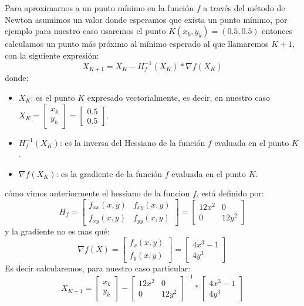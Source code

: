 \justify
Para aproximarnos a un punto mínimo en la función $f$ a través del método de Newton asumimos un valor donde esperamos que exista un punto mínimo, por ejemplo para nuestro caso usaremos el punto $K(x_{k},y_{k})=(0.5,0.5)$ entonces calculamos un punto más próximo al mínimo esperado al que llamaremos $K+1$, con la siguiente expresión:
\[X_{K+1}=X_{K}-H^{-1}_{f}(X_{K}) * \nabla f(X_{K}) \]
\flushleft
donde:
\begin{itemize}
    \item $X_{K}$: es el punto $K$ expresado vectorialmente, es decir, en nuestro caso $X_{K}=\begin{bmatrix}
        x_{k} \\
        y_{k}
    \end{bmatrix}=
    \begin{bmatrix}
        0.5 \\
        0.5
    \end{bmatrix}$.
    \item $H^{-1}_{f}(X_{K})$: es  la inversa del Hessiano de la función $f$ evaluada en el punto $K$.
    \item $\nabla f(X_{K})$: es la gradiente de la función $f$ evaluada en el punto $K$.
\end{itemize}

\framebreak

cómo vimos anteriormente el hessiano de la funcion $f$, está definido por:
\[H_{f}=\begin{bmatrix}
  f_{xx}(x,y) & f_{xy}(x,y)\\
 f_{xy}(x,y) & f_{yy}(x,y)
\end{bmatrix}=
\begin{bmatrix}
  12x^{2} & 0\\
 0 & 12y^{2}
\end{bmatrix}\]
y la gradiente no es mas qué:
\[\nabla f(X) = \begin{bmatrix}
    f_{x}(x,y)\\
    f_{y}(x,y)
\end{bmatrix}
=\begin{bmatrix}
    4x^{3}-1\\
    4y^{3}
\end{bmatrix}\]
Es decir calcularemos, para nuestro caso particular:
\[X_{K+1}=\begin{bmatrix}
        x_{k} \\
        y_{k}
    \end{bmatrix}-\begin{bmatrix}
  12x^{2} & 0\\
 0 & 12y^{2}
\end{bmatrix}^{-1} * \begin{bmatrix}
    4x^{3}-1\\
    4y^{3}
\end{bmatrix}\]

